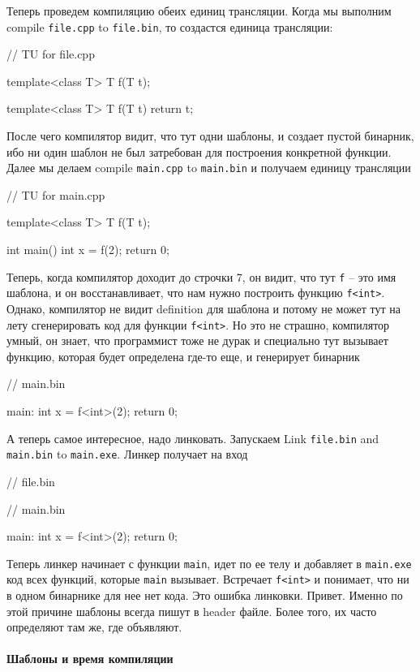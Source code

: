 Теперь проведем компиляцию обеих единиц трансляции.
Когда мы выполним compile \verb"file.cpp" to \verb"file.bin", то создастся единица трансляции:
\begin{cppcode}
// TU for file.cpp

template<class T>
T f(T t);

template<class T>
T f(T t) {
  return t;
}
\end{cppcode}
После чего компилятор видит, что тут одни шаблоны, и создает пустой бинарник, ибо ни один шаблон не был затребован для построения конкретной функции.
Далее мы делаем compile \verb"main.cpp" to \verb"main.bin" и получаем единицу трансляции
\begin{cppcode}
// TU for main.cpp

template<class T>
T f(T t);

int main() {
  int x = f(2);
  return 0;
}
\end{cppcode}
Теперь, когда компилятор доходит до строчки 7, он видит, что тут \verb"f" -- это имя шаблона, и он восстанавливает, что нам нужно построить функцию \verb"f<int>".
Однако, компилятор не видит definition для шаблона и потому не может тут на лету сгенерировать код для функции \verb"f<int>".
Но это не страшно, компилятор умный, он знает, что программист тоже не дурак и специально тут вызывает функцию, которая будет определена где-то еще, и генерирует бинарник
\begin{cppcode}
// main.bin

main:
  int x = f<int>(2);
  return 0;
\end{cppcode}
А теперь самое интересное, надо линковать.
Запускаем Link \verb"file.bin" and \verb"main.bin" to \verb"main.exe".
Линкер получает на вход
\begin{cppcode}
// file.bin

// main.bin

main:
  int x = f<int>(2);
  return 0;
\end{cppcode}
Теперь линкер начинает с функции \verb"main", идет по ее телу и добавляет в \verb"main.exe" код всех функций, которые \verb"main" вызывает.
Встречает \verb"f<int>" и понимает, что ни в одном бинарнике для нее нет кода.
Это ошибка линковки.
Привет.
Именно по этой причине шаблоны всегда пишут в header файле.
Более того, их часто определяют там же, где объявляют.

\paragraph{Шаблоны и время компиляции}

